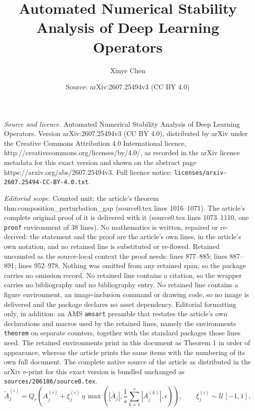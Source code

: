 \documentclass[10pt,a4paper]{amsart}
\title{Automated Numerical Stability Analysis of Deep Learning Operators}
\author{Xinye Chen}
\date{Source: arXiv:2607.25494v3 (CC BY 4.0)}
\begin{document}
\maketitle

\noindent\emph{Source and licence.} Automated Numerical Stability Analysis of Deep Learning Operators. Version arXiv:2607.25494v3 (CC BY 4.0), distributed by arXiv under the Creative Commons Attribution 4.0 International licence, http://creativecommons.org/licenses/by/4.0/, as recorded in the arXiv licence metadata for this exact version and shown on the abstract page https://arxiv.org/abs/2607.25494v3. Full licence notice: \texttt{licenses/arxiv-2607.25494-CC-BY-4.0.txt}.\par\smallskip

\noindent\textit{Editorial scope.} Counted unit: the article's theorem thm:composition\_perturbation\_gap (source0.tex lines 1016--1071). The article's complete original proof of it is delivered with it (source0.tex lines 1073--1110, one \texttt{proof} environment of 38 lines). No mathematics is written, repaired or re-derived: the statement and the proof are the article's own lines, in the article's own notation, and no retained line is substituted or re-flowed.  Retained uncounted as the source-local context the proof needs: lines 877--885; lines 887--891; lines 952--978.  Nothing was omitted from any retained span, so the package carries no omission record.  No retained line contains a citation, so the wrapper carries no bibliography and no bibliography entry.  No retained line contains a figure environment, an image-inclusion command or drawing code, so no image is delivered and the package declares no asset dependency.  Editorial formatting only, in addition: an AMS \texttt{amsart} preamble that restates the article's own declarations and macros used by the retained lines, namely the environments \texttt{theorem} on separate counters, together with the standard packages those lines need.  The retained environments print in this document as Theorem 1 in order of appearance, whereas the article prints the same items with the numbering of its own full document.  The complete native source of the article as distributed in the arXiv e-print for this exact version is bundled unchanged as \texttt{sources/206186/source0.tex}.
\begin{equation}
\widetilde{A}^{(i)}_j =
Q_r\!\left(A^{(i)}_j + \xi^{(i)}_j\,\eta\,
\max\!\left(|\overline{A}_j|,
\frac{1}{s}\sum_{k=1}^{s}|A^{(k)}_j|,\epsilon\right)\right),
\qquad
\xi^{(i)}_j\sim\mathcal{U}[-1,1],
\label{eq:gemm_data_perturbation}
\end{equation}
\end{document}
